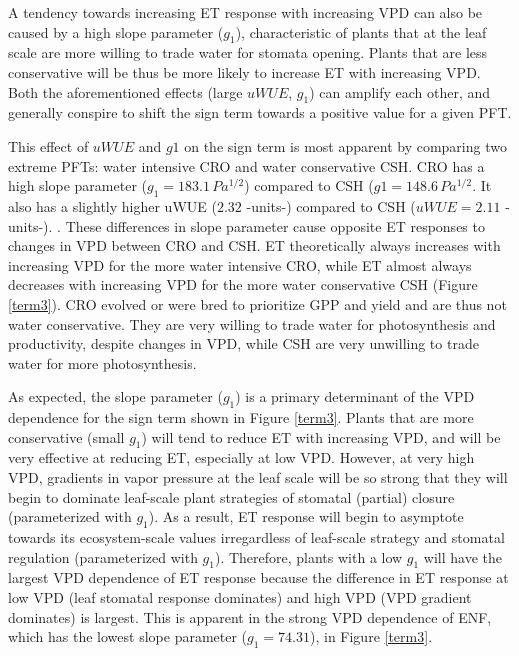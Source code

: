 \documentclass[draft,linenumbers]{gcbjournal}
\begin{document}
A tendency towards increasing ET response with increasing VPD can also be caused by a high slope parameter ($g_1$), characteristic of plants that at the leaf scale are more willing to trade water for stomata opening. Plants that are less conservative will be thus be more likely to increase ET with increasing VPD. Both the aforementioned effects (large $uWUE$, $g_1$) can amplify each other, and generally conspire to shift the sign term towards a positive value for a given PFT.

This effect of $uWUE$ and $g1$ on the sign term is most apparent by comparing two extreme PFTs: water intensive CRO and water conservative CSH. CRO has a high slope parameter ($g_1 = 183.1 \, Pa^{1/2}$) compared to CSH ($g1 = 148.6 \, Pa^{1/2}$. It also has a slightly higher uWUE ($2.32$ -units-) compared to CSH ($uWUE=2.11$ -units-). . These differences in slope parameter cause opposite ET responses to changes in VPD between CRO and CSH. ET theoretically always increases with increasing VPD for the more water intensive CRO, while ET almost always decreases with increasing VPD for the more water conservative CSH (Figure \ref{term3}). CRO evolved or were bred to prioritize GPP and yield and are thus not water conservative. They are very willing to trade water for photosynthesis and productivity, despite changes in VPD, while CSH are very unwilling to trade water for more photosynthesis.

As expected, the slope parameter ($g_1$) is a primary determinant of the VPD dependence for the sign term shown in Figure \ref{term3}. Plants that are more conservative (small $g_1$) will tend to reduce ET with increasing VPD, and will be very effective at reducing ET, especially at low VPD. However, at very high VPD, gradients in vapor pressure at the leaf scale will be so strong that they will begin to dominate leaf-scale plant strategies of stomatal (partial) closure (parameterized with $g_1$). As a result, ET response will begin to asymptote towards its ecosystem-scale values irregardless of leaf-scale strategy and stomatal regulation (parameterized with $g_1$). Therefore, plants with a low $g_1$ will have the largest VPD dependence of ET response because the difference in ET response at low VPD (leaf stomatal response dominates) and high VPD (VPD gradient dominates) is largest. This is apparent in the strong VPD dependence of ENF, which has the lowest slope parameter ($g_1=74.31$), in Figure \ref{term3}.  
\end{document}
